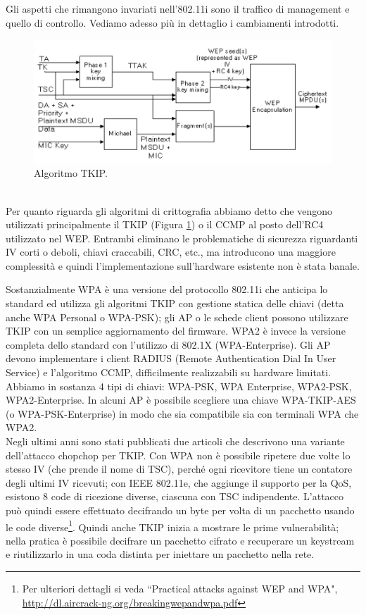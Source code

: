 Gli aspetti che rimangono invariati nell'802.11i sono il traffico di management e quello di controllo. Vediamo adesso più in dettaglio i cambiamenti introdotti.\\
\begin{figure}[htbp]
	\centering
	\includegraphics[scale = 0.3]{images/802_11i-encryption}
	\caption{Algoritmo TKIP.}
	\label{img:802.11i-encryption}
\end{figure}\\
Per quanto riguarda gli algoritmi di crittografia abbiamo detto che vengono utilizzati principalmente il TKIP (Figura \ref{img:802.11i-encryption}) o il CCMP al posto dell'RC4 utilizzato nel WEP. Entrambi eliminano le problematiche di sicurezza riguardanti IV corti o deboli, chiavi craccabili, CRC, etc., ma introducono una maggiore complessità e quindi l'implementazione sull'hardware esistente non è stata banale.

Sostanzialmente WPA è una versione del protocollo 802.11i che anticipa lo standard ed utilizza gli algoritmi TKIP con gestione statica delle chiavi (detta anche WPA Personal o WPA-PSK); gli AP o le schede client possono utilizzare TKIP con un semplice aggiornamento del firmware. WPA2 è invece la versione completa dello standard con l'utilizzo di 802.1X (WPA-Enterprise). Gli AP devono implementare i client RADIUS (Remote Authentication Dial In User Service) e l'algoritmo CCMP, difficilmente realizzabili su hardware limitati. Abbiamo in sostanza 4 tipi di chiavi: WPA-PSK, WPA Enterprise, WPA2-PSK, WPA2-Enterprise. In alcuni AP è possibile scegliere una chiave WPA-TKIP-AES (o WPA-PSK-Enterprise) in modo che sia compatibile sia con terminali WPA che WPA2.\\

Negli ultimi anni sono stati pubblicati due articoli che descrivono una variante dell'attacco chopchop per TKIP. Con WPA non è possibile ripetere due volte lo stesso IV (che prende il nome di TSC), perché ogni ricevitore tiene un contatore degli ultimi IV ricevuti; con IEEE 802.11e, che aggiunge il supporto per la QoS, esistono 8 code di ricezione diverse, ciascuna con TSC indipendente. L'attacco può quindi essere effettuato decifrando un byte per volta di un pacchetto usando le code diverse\footnote{Per ulteriori dettagli si veda \textquotedblleft Practical attacks against WEP and WPA", \url{http://dl.aircrack-ng.org/breakingwepandwpa.pdf}}. Quindi anche TKIP inizia a mostrare le prime vulnerabilità; nella pratica è possibile decifrare un pacchetto cifrato e recuperare un keystream e riutilizzarlo in una coda distinta per iniettare un pacchetto nella rete.\\

